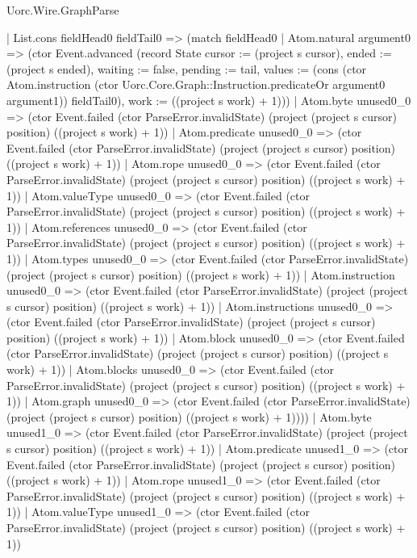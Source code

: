 \begin{lexlean}{Uorc.Wire.GraphParse}
\begin{semanticmodule}
{            | List.cons fieldHead0 fieldTail0 => (match fieldHead0
              | Atom.natural argument0 => (ctor Event.advanced (record State {cursor := (project s cursor), ended := (project s ended), waiting := false, pending := tail, values := (cons (ctor Atom.instruction (ctor Uorc.Core.Graph::Instruction.predicateOr argument0 argument1)) fieldTail0), work := ((project s work) + 1)}))
              | Atom.byte unused0_0 => (ctor Event.failed (ctor ParseError.invalidState) (project (project s cursor) position) ((project s work) + 1))
              | Atom.predicate unused0_0 => (ctor Event.failed (ctor ParseError.invalidState) (project (project s cursor) position) ((project s work) + 1))
              | Atom.rope unused0_0 => (ctor Event.failed (ctor ParseError.invalidState) (project (project s cursor) position) ((project s work) + 1))
              | Atom.valueType unused0_0 => (ctor Event.failed (ctor ParseError.invalidState) (project (project s cursor) position) ((project s work) + 1))
              | Atom.references unused0_0 => (ctor Event.failed (ctor ParseError.invalidState) (project (project s cursor) position) ((project s work) + 1))
              | Atom.types unused0_0 => (ctor Event.failed (ctor ParseError.invalidState) (project (project s cursor) position) ((project s work) + 1))
              | Atom.instruction unused0_0 => (ctor Event.failed (ctor ParseError.invalidState) (project (project s cursor) position) ((project s work) + 1))
              | Atom.instructions unused0_0 => (ctor Event.failed (ctor ParseError.invalidState) (project (project s cursor) position) ((project s work) + 1))
              | Atom.block unused0_0 => (ctor Event.failed (ctor ParseError.invalidState) (project (project s cursor) position) ((project s work) + 1))
              | Atom.blocks unused0_0 => (ctor Event.failed (ctor ParseError.invalidState) (project (project s cursor) position) ((project s work) + 1))
              | Atom.graph unused0_0 => (ctor Event.failed (ctor ParseError.invalidState) (project (project s cursor) position) ((project s work) + 1))))
          | Atom.byte unused1_0 => (ctor Event.failed (ctor ParseError.invalidState) (project (project s cursor) position) ((project s work) + 1))
          | Atom.predicate unused1_0 => (ctor Event.failed (ctor ParseError.invalidState) (project (project s cursor) position) ((project s work) + 1))
          | Atom.rope unused1_0 => (ctor Event.failed (ctor ParseError.invalidState) (project (project s cursor) position) ((project s work) + 1))
          | Atom.valueType unused1_0 => (ctor Event.failed (ctor ParseError.invalidState) (project (project s cursor) position) ((project s work) + 1))
}
\end{semanticmodule}
\end{lexlean}
